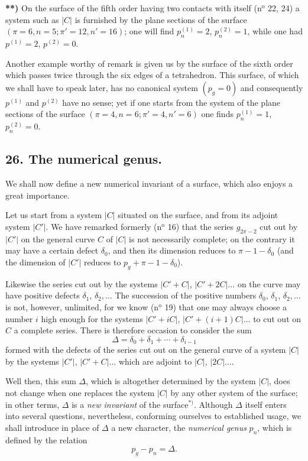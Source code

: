 \documentclass{article}
\begin{document}
\textbf{**)} On the surface of the fifth order having two contacts with itself (n${}^{\text{o}}$ 22, 24) a system such as $|C|$ is furnished by the plane sections of the surface $(\pi = 6, n = 5; \pi' = 12, n' = 16)$; one will find $p_{n}^{(1)} = 2$, $p_{n}^{(2)} = 1$, while one had $p^{(1)} = 2$, $p^{(2)} = 0$.

Another example worthy of remark is given us by the surface of the sixth order which passes twice through the six edges of a tetrahedron. This surface, of which we shall have to speak later, has no canonical system $(p_{g} = 0)$ and consequently $p^{(1)}$ and $p^{(2)}$ have no sense; yet if one starts from the system of the plane sections of the surface $(\pi = 4, n = 6; \pi' = 4, n' = 6)$ one finds $p_{n}^{(1)} = 1$, $p_{n}^{(2)} = 0$.


\subsection*{26. The numerical genus.}

We shall now define a new numerical invariant of a surface, which also enjoys a great importance.

Let us start from a system $|C|$ situated on the surface, and from its adjoint system $|C'|$. We have remarked formerly (n${}^{\text{o}}$ 16) that the series $g_{2\pi-2}$ cut out by $|C'|$ on the general curve $C$ of $|C|$ is not necessarily complete; on the contrary it may have a certain defect $\delta_{0}$, and then its dimension reduces to $\pi - 1 - \delta_{0}$ (and the dimension of $|C'|$ reduces to $p_{g} + \pi - 1 - \delta_{0}$).

Likewise the series cut out by the systems $|C' + C|$, $|C' + 2C| \ldots$ on the curve may have positive defects $\delta_{1}$, $\delta_{2}, \ldots$ The succession of the positive numbers $\delta_{0}$, $\delta_{1}$, $\delta_{2}, \ldots$ is not, however, unlimited, for we know (n${}^{\text{o}}$ 19) that one may always choose a number $i$ high enough for the systems $|C' + iC|$, $|C' + (i+1)C| \ldots$ to cut out on $C$ a complete series. There is therefore occasion to consider the sum
\[
\Delta = \delta_{0} + \delta_{1} + \cdots + \delta_{i-1}
\]
formed with the defects of the series cut out on the general curve of a system $|C|$ by the systems $|C'|$, $|C' + C| \ldots$ which are adjoint to $|C|$, $|2C| \ldots$.

Well then, this sum $\Delta$, which is altogether determined by the system $|C|$, does not change when one replaces the system $|C|$ by any other system of the surface; in other terms, $\Delta$ is a \emph{new invariant} of the surface${}^{*)}$. Although $\Delta$ itself enters into several questions, nevertheless, conforming ourselves to established usage, we shall introduce in place of $\Delta$ a new character, the \emph{numerical genus} $p_{n}$, which is defined by the relation
\[
p_{g} - p_{n} = \Delta.
\]
\end{document}
